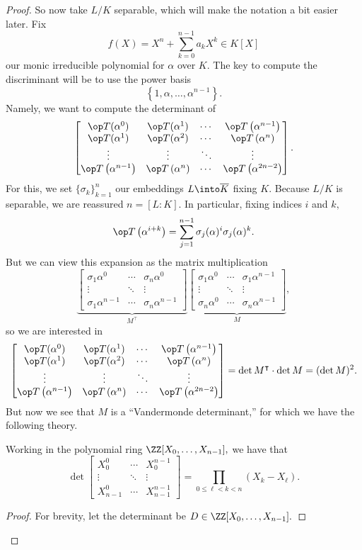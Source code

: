 \documentclass[../notes.tex]{subfiles}
\begin{document}
\begin{proof}
	So now take $L/K$ separable, which will make the notation a bit easier later. Fix
	\[f(X)=X^n+\sum_{k=0}^{n-1}a_kX^k\in K[X]\]
	our monic irreducible polynomial for $\alpha$ over $K.$ The key to compute the discriminant will be to use the power basis
	\[\left\{1,\alpha,\ldots,\alpha^{n-1}\right\}.\]
	Namely, we want to compute the determinant of
	\[\begin{bmatrix}
		\op T(\alpha^0) & \op T(\alpha^1) & \cdots & \op T\left(\alpha^{n-1}\right) \\
		\op T(\alpha^1) & \op T(\alpha^2) & \cdots & \op T\left(\alpha^n\right)\\
		\vdots & \vdots & \ddots & \vdots \\
		\op T\left(\alpha^{n-1}\right) & \op T\left(\alpha^n\right) & \cdots & \op T\left(\alpha^{2n-2}\right)
	\end{bmatrix}.\]
	For this, we set $\{\sigma_k\}_{k=1}^n$ our embeddings $L\into\overline K$ fixing $K.$ Because $L/K$ is separable, we are reassured $n=[L:K].$ In particular, fixing indices $i$ and $k,$
	\[\op T\left(\alpha^{i+k}\right)=\sum_{j=1}^{n-1}\sigma_j(\alpha)^i\sigma_j(\alpha)^k.\]
	But we can view this expansion as the matrix multiplication
	\[\underbrace{\begin{bmatrix}
		\sigma_1\alpha^0 & \cdots & \sigma_n\alpha^0 \\
		\vdots & \ddots & \vdots \\
		\sigma_1\alpha^{n-1} & \cdots & \sigma_n\alpha^{n-1}
	\end{bmatrix}}_{M^\intercal}\underbrace{\begin{bmatrix}
		\sigma_1\alpha^0 & \cdots & \sigma_1\alpha^{n-1} \\
		\vdots & \ddots & \vdots \\
		\sigma_n\alpha^0 & \cdots & \sigma_n\alpha^{n-1}
	\end{bmatrix}}_M,\]
	so we are interested in
	\[\begin{bmatrix}
		\op T(\alpha^0) & \op T(\alpha^1) & \cdots & \op T\left(\alpha^{n-1}\right) \\
		\op T(\alpha^1) & \op T(\alpha^2) & \cdots & \op T\left(\alpha^n\right)\\
		\vdots & \vdots & \ddots & \vdots \\
		\op T\left(\alpha^{n-1}\right) & \op T\left(\alpha^n\right) & \cdots & \op T\left(\alpha^{2n-2}\right)
	\end{bmatrix}=\det M^\intercal\cdot\det M=(\det M)^2.\]
	But now we see that $M$ is a ``Vandermonde determinant,'' for which we have the following theory.
	\begin{lemma} \label{lem:vandermonde}
		Working in the polynomial ring $\ZZ[X_0,\ldots,X_{n-1}],$ we have that
		\[\det\begin{bmatrix}
			X_0^0 & \cdots & X_0^{n-1} \\
			\vdots & \ddots & \vdots \\
			X_{n-1}^0 & \cdots & X_{n-1}^{n-1}
		\end{bmatrix}=\prod_{0\le \ell<k<n}(X_k-X_\ell).\]
	\end{lemma}
	\begin{proof}
		For brevity, let the determinant be $D\in\ZZ[X_0,\ldots,X_{n-1}].$
		

\end{proof}
\end{proof}
\end{document}
